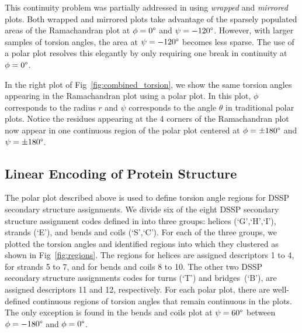 \documentclass[10pt,letterpaper]{article}
\renewcommand{\figurename}{Fig}
\begin{document}
\begin{figure*}[!h]
\caption{Ramachandran plot (right) and polar plot (left) of randomly sampled torsion angles}
\label{fig:combined_torsion}
\end{figure*}

This continuity problem was partially addressed in \cite{Karplus2010} using \emph{wrapped} and \emph{mirrored} plots. 
Both wrapped and mirrored plots take advantage of the sparsely populated areas of the Ramachandran plot at $\phi = 0\degree$ and $\psi = -120\degree$.
However, with larger samples of torsion angles, the area at $\psi = -120\degree$ becomes less sparse. 
The use of a polar plot resolves this elegantly by only requiring one break in continuity at $\phi = 0\degree$. 

In the right plot of \figurename~\ref{fig:combined_torsion}, we show the same torsion angles appearing in the Ramachandran plot using a polar plot. 
In this plot, $\phi$ corresponds to the radius $r$ and $\psi$ corresponds to the angle $\theta$ in traditional polar plots. 
Notice the residues appearing at the 4 corners of the Ramachandran plot now appear in one continuous region of the polar plot centered at $\phi = \pm180\degree$ and $\psi = \pm180\degree$. 

\subsection*{Linear Encoding of Protein Structure}

The polar plot described above is used to define torsion angle regions for DSSP secondary structure assignments.
We divide six of the eight DSSP secondary structure assignment codes defined in \cite{Kabsch1983} into three groups: helices (`G',`H',`I'), strands (`E'), and bends and coils (`S',`C').
For each of the three groups, we plotted the torsion angles and identified regions into which they clustered as shown in \figurename~\ref{fig:regions}.
The regions for helices are assigned descriptors 1 to 4, for strands 5 to 7, and for bends and coils 8 to 10. 
The other two DSSP secondary structure assignments codes for turns (`T') and bridges~(`B'), are assigned descriptors 11 and 12, respectively.
For each polar plot, there are well-defined continuous regions of torsion angles that remain continuous in the plots. 
The only exception is found in the bends and coils plot at $\psi = 60\degree$ between $\phi = -180\degree$ and $\phi = 0\degree$.

\begin{figure*}[!h]
\caption{Polar plots of randomly sampled torsion angles with designated descriptors for region and DSSP code combinations}
\label{fig:regions}
\end{figure*}
\end{document}
